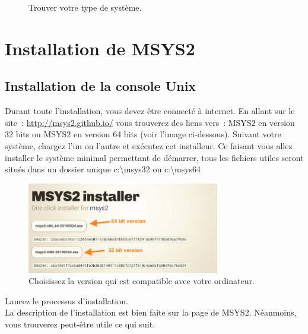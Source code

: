 \documentclass{article}
\begin{document}
\begin{figure}[H]
\begin{subfigure}[c]{0.5\textwidth}
\end{subfigure}
\caption{Trouver votre type de système.}
\end{figure}

\section{Installation de MSYS2}
\subsection{Installation de la console Unix}
Durant toute l'installation, vous devez être connecté à internet. En allant sur le site : \href{http://msys2.github.io/}{http://msys2.github.io/} vous trouverez des liens vers : MSYS2 en version 32 bits ou MSYS2 en version 64 bits (voir l'image ci-dessous). Suivant votre système, chargez l'un ou l'autre et exécutez cet installeur. Ce faisant vous allez installer le système minimal permettant de démarrer, tous les fichiers utiles seront situés dans un dossier unique c:\textbackslash msys32 ou c:\textbackslash msys64
\begin{figure}[H]
\center
\includegraphics[width=0.75\textwidth]{Plots/Msys2_0.png}
\caption{Choisissez la version qui est compatible avec votre ordinateur.}
\end{figure}
Lancez le processus d'installation.\\
La description de l'installation est bien faite sur la page de MSYS2. Néanmoins, vous trouverez peut-être utile ce qui suit.
\end{document}
